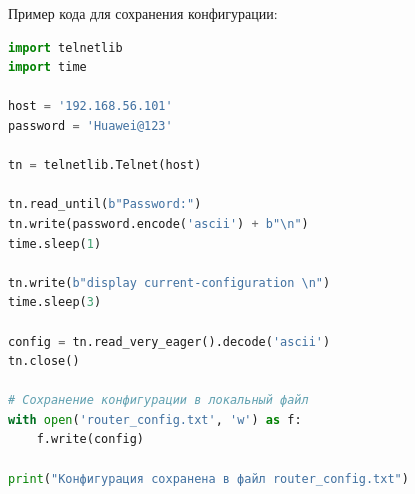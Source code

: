 Пример кода для сохранения конфигурации:

\begin{lstlisting}[language=Python]
import telnetlib
import time

host = '192.168.56.101'
password = 'Huawei@123'

tn = telnetlib.Telnet(host)

tn.read_until(b"Password:")
tn.write(password.encode('ascii') + b"\n")
time.sleep(1)

tn.write(b"display current-configuration \n")
time.sleep(3)

config = tn.read_very_eager().decode('ascii')
tn.close()

# Сохранение конфигурации в локальный файл
with open('router_config.txt', 'w') as f:
    f.write(config)
    
print("Конфигурация сохранена в файл router_config.txt")
\end{lstlisting}